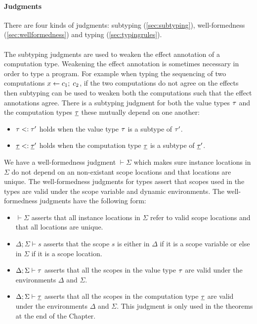 {\paragraph{Judgments}
There are four kinds of judgments: subtyping (\cref{sec:subtyping}), well-formedness (\cref{sec:wellformedness}) and typing (\cref{sec:typingrules}).
\\\\
The subtyping judgments are used to weaken the effect annotation of a computation type.
Weakening the effect annotation is sometimes necessary in order to type a program.
For example when typing the sequencing of two computations $x \leftarrow c_1 ;\; c_2$, if the two computations do not agree on the effects then subtyping can be used to weaken both the computations such that the effect annotations agree.
There is a subtyping judgment for both the value types $\tau$ and the computation types $\underline{\tau}$ these mutually depend on one another:
\begin{itemize}
\setlength\itemsep{0.5em}
\item $\tau <: \tau'$ holds when the value type $\tau$ is a subtype of $\tau'$.
\item $\underline{\tau} <: \underline{\tau}'$ holds when the computation type $\underline{\tau}$ is a subtype of $\underline{\tau}'$.
\end{itemize}

We have a well-formedness judgment $\vdash \Sigma$ which makes sure instance locations in $\Sigma$ do not depend on an non-existant scope locations and that locations are unique.
The well-formedness judgments for types assert that scopes used in the types are valid under the scope variable and dynamic environments.
The well-formedness judgments have the following form:
\begin{itemize}
\setlength\itemsep{0.5em}
\item $\vdash \Sigma$ asserts that all instance locations in $\Sigma$ refer to valid scope locations and that all locations are unique.
\item $\Delta;\Sigma \vdash s$ asserts that the scope $s$ is either in $\Delta$ if it is a scope variable or else in $\Sigma$ if it is a scope location.
\item $\Delta;\Sigma \vdash \tau$ asserts that all the scopes in the value type $\tau$ are valid under the environments $\Delta$ and $\Sigma$.
\item $\Delta;\Sigma \vdash \underline{\tau}$ asserts that all the scopes in the computation type $\underline{\tau}$ are valid under the environments $\Delta$ and $\Sigma$. This judgment is only used in the theorems at the end of the Chapter.
\end{itemize}

}
